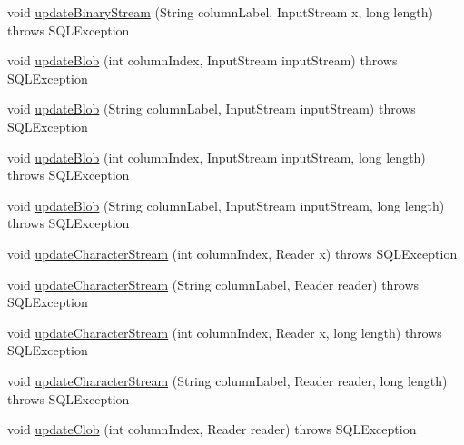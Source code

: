 \begin{DoxyCompactItemize}
\item 
void \mbox{\hyperlink{classcom_1_1mysql_1_1cj_1_1jdbc_1_1result_1_1_result_set_impl_a35e1683c6dfda602277b4ced8562001b}{update\+Binary\+Stream}} (String column\+Label, Input\+Stream x, long length)  throws S\+Q\+L\+Exception 
\item 
void \mbox{\hyperlink{classcom_1_1mysql_1_1cj_1_1jdbc_1_1result_1_1_result_set_impl_a30ad3f0b0e9d62d2052a354fd01d8e46}{update\+Blob}} (int column\+Index, Input\+Stream input\+Stream)  throws S\+Q\+L\+Exception 
\item 
void \mbox{\hyperlink{classcom_1_1mysql_1_1cj_1_1jdbc_1_1result_1_1_result_set_impl_ab8ca4b5622be83e3ed39bf74d09db631}{update\+Blob}} (String column\+Label, Input\+Stream input\+Stream)  throws S\+Q\+L\+Exception 
\item 
void \mbox{\hyperlink{classcom_1_1mysql_1_1cj_1_1jdbc_1_1result_1_1_result_set_impl_a609aa095e52384f6b21cfab8b8b63608}{update\+Blob}} (int column\+Index, Input\+Stream input\+Stream, long length)  throws S\+Q\+L\+Exception 
\item 
void \mbox{\hyperlink{classcom_1_1mysql_1_1cj_1_1jdbc_1_1result_1_1_result_set_impl_a1b0c64af799795925fa382af77223775}{update\+Blob}} (String column\+Label, Input\+Stream input\+Stream, long length)  throws S\+Q\+L\+Exception 
\item 
void \mbox{\hyperlink{classcom_1_1mysql_1_1cj_1_1jdbc_1_1result_1_1_result_set_impl_a903ab0502049e0b71367bc465ce980df}{update\+Character\+Stream}} (int column\+Index, Reader x)  throws S\+Q\+L\+Exception 
\item 
void \mbox{\hyperlink{classcom_1_1mysql_1_1cj_1_1jdbc_1_1result_1_1_result_set_impl_a110b434a5b2ce0837303dd5f940eae55}{update\+Character\+Stream}} (String column\+Label, Reader reader)  throws S\+Q\+L\+Exception 
\item 
void \mbox{\hyperlink{classcom_1_1mysql_1_1cj_1_1jdbc_1_1result_1_1_result_set_impl_a468cef5c5edb34686572400d1ea9d8bb}{update\+Character\+Stream}} (int column\+Index, Reader x, long length)  throws S\+Q\+L\+Exception 
\item 
void \mbox{\hyperlink{classcom_1_1mysql_1_1cj_1_1jdbc_1_1result_1_1_result_set_impl_a816f26d641464baaff0b4a97bb8dc7cf}{update\+Character\+Stream}} (String column\+Label, Reader reader, long length)  throws S\+Q\+L\+Exception 
\item 
void \mbox{\hyperlink{classcom_1_1mysql_1_1cj_1_1jdbc_1_1result_1_1_result_set_impl_a4b0f91ffe0051aae8862a2ea2ee9ea27}{update\+Clob}} (int column\+Index, Reader reader)  throws S\+Q\+L\+Exception 

\end{DoxyCompactItemize}
